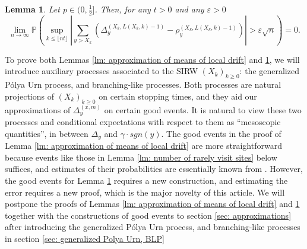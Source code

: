 \documentclass[twoside,12pt, a4paper, final]{article}
\newtheorem{lemma}{Lemma}[section]
\numberwithin{equation}{section}
\theoremstyle{remark}
\newcommand{\abs}[1]{\left\vert #1 \right\vert}
\newcommand{\edt}[1]{\textcolor{red}{#1}} %
\begin{document}
	\begin{lemma}\label{lm: approx local drift by conditional means}
		Let $p\in (0,\frac{1}{2}]$. Then, for any $t>0$ and any $\varepsilon >0$
		\begin{equation}\label{eq: control of martingale difference for local drift}
			\lim_{n \to \infty }\mathbb{P}\left(\sup_{k\leq\lfloor nt \rfloor} \abs{\sum_{y> X_k} \left(\Delta_{y}^{(X_k,L(X_k,k)-1)}- \rho_{y}^{(X_k,L(X_k,k)-1)} \right)   }  > \varepsilon \sqrt{n}  \right) =0. 
		\end{equation}
	\end{lemma}
	
	
	
	To prove both Lemmas \ref{lm: approximation of means of local drift} and \ref{lm: approx local drift by conditional means}, we will introduce auxiliary processes associated to the SIRW $(X_k)_{k\geq 0}$: the generalized P\'{o}lya Urn process, and branching-like processes. Both processes are natural projections of $(X_k)_{k\geq 0}$ on certain stopping times, and they aid our approximations of $\Delta_{y}^{(x,m)}$ on certain good events. 
	It is natural to view these two processes and conditional expectations with respect to them as ``mesoscopic quantities'', in between $\Delta_y$ and $\gamma\cdot sgn(y)$.
	The good events in the proof of Lemma \ref{lm: approximation of means of local drift} are more straightforward because events like those in Lemma \ref{lm: number of rarely visit sites} below suffices, and estimates of their probabilities are essentially known from \cite{KMP23}. However, the good events for Lemma \ref{lm: approx local drift by conditional means} requires a new construction, and estimating the error requires a new proof, which is the major novelty of this article. We will postpone the proofs of Lemmas \ref{lm: approximation of means of local drift} and \ref{lm: approx local drift by conditional means} together with the constructions of good events to section \ref{sec: approximations} after introducing the generalized P\'{o}lya Urn process, and branching-like processes in section \ref{sec: generalized Polya Urn, BLP}
	
\end{document}
